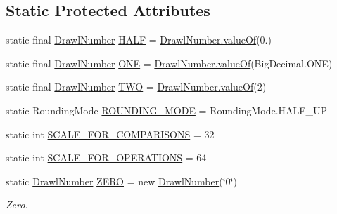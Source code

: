 \subsection*{Static Protected Attributes}
\begin{DoxyCompactItemize}
\item 
static final \hyperlink{classcom_1_1aarrelaakso_1_1drawl_1_1_drawl_number}{Drawl\+Number} \hyperlink{classcom_1_1aarrelaakso_1_1drawl_1_1_drawl_number_ae0980b8dd35b0bb52b87b37700d15322}{H\+A\+LF} = \hyperlink{classcom_1_1aarrelaakso_1_1drawl_1_1_drawl_number_a3fd17115c85e2bfc9e881838a3f7d735}{Drawl\+Number.\+value\+Of}(0.)
\item 
static final \hyperlink{classcom_1_1aarrelaakso_1_1drawl_1_1_drawl_number}{Drawl\+Number} \hyperlink{classcom_1_1aarrelaakso_1_1drawl_1_1_drawl_number_a0cd06e1d6344869ed300bc99afcde20a}{O\+NE} = \hyperlink{classcom_1_1aarrelaakso_1_1drawl_1_1_drawl_number_a3fd17115c85e2bfc9e881838a3f7d735}{Drawl\+Number.\+value\+Of}(Big\+Decimal.\+O\+NE)
\item 
static final \hyperlink{classcom_1_1aarrelaakso_1_1drawl_1_1_drawl_number}{Drawl\+Number} \hyperlink{classcom_1_1aarrelaakso_1_1drawl_1_1_drawl_number_a2bb7476cfb1cc76e2742cd00feb463c3}{T\+WO} = \hyperlink{classcom_1_1aarrelaakso_1_1drawl_1_1_drawl_number_a3fd17115c85e2bfc9e881838a3f7d735}{Drawl\+Number.\+value\+Of}(2)
\item 
static Rounding\+Mode \hyperlink{classcom_1_1aarrelaakso_1_1drawl_1_1_drawl_number_ab4b44bb0675da90d8f435286911b711e}{R\+O\+U\+N\+D\+I\+N\+G\+\_\+\+M\+O\+DE} = Rounding\+Mode.\+H\+A\+L\+F\+\_\+\+UP
\item 
static int \hyperlink{classcom_1_1aarrelaakso_1_1drawl_1_1_drawl_number_ace1cb62d1ecce8212578d1a13cf5cbc4}{S\+C\+A\+L\+E\+\_\+\+F\+O\+R\+\_\+\+C\+O\+M\+P\+A\+R\+I\+S\+O\+NS} = 32
\item 
static int \hyperlink{classcom_1_1aarrelaakso_1_1drawl_1_1_drawl_number_ab9bb5bf4986830f56f01cb218ba637ce}{S\+C\+A\+L\+E\+\_\+\+F\+O\+R\+\_\+\+O\+P\+E\+R\+A\+T\+I\+O\+NS} = 64
\item 
static \hyperlink{classcom_1_1aarrelaakso_1_1drawl_1_1_drawl_number}{Drawl\+Number} \hyperlink{classcom_1_1aarrelaakso_1_1drawl_1_1_drawl_number_a14c9ceff1fb3f2bd5c3b380183db933a}{Z\+E\+RO} = new \hyperlink{classcom_1_1aarrelaakso_1_1drawl_1_1_drawl_number}{Drawl\+Number}(\char`\"{}0\char`\"{})
\begin{DoxyCompactList}\small\item\em Zero. \end{DoxyCompactList}\item 

\end{DoxyCompactItemize}
